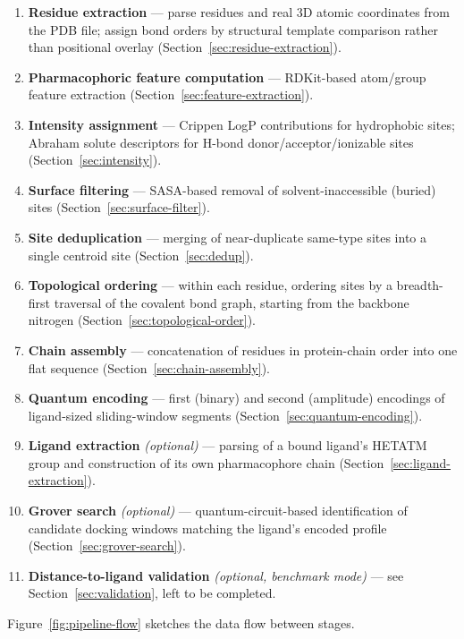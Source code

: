 \documentclass[11pt,a4paper]{article}
\begin{document}
\begin{enumerate}[leftmargin=1.8em]
    \item \textbf{Residue extraction} — parse residues and real 3D atomic coordinates from the PDB file; assign bond orders by structural template comparison rather than positional overlay (Section~\ref{sec:residue-extraction}).
    \item \textbf{Pharmacophoric feature computation} — RDKit-based atom/group feature extraction (Section~\ref{sec:feature-extraction}).
    \item \textbf{Intensity assignment} — Crippen LogP contributions for hydrophobic sites; Abraham solute descriptors for H-bond donor/acceptor/ionizable sites (Section~\ref{sec:intensity}).
    \item \textbf{Surface filtering} — SASA-based removal of solvent-inaccessible (buried) sites (Section~\ref{sec:surface-filter}).
    \item \textbf{Site deduplication} — merging of near-duplicate same-type sites into a single centroid site (Section~\ref{sec:dedup}).
    \item \textbf{Topological ordering} — within each residue, ordering sites by a breadth-first traversal of the covalent bond graph, starting from the backbone nitrogen (Section~\ref{sec:topological-order}).
    \item \textbf{Chain assembly} — concatenation of residues in protein-chain order into one flat sequence (Section~\ref{sec:chain-assembly}).
    \item \textbf{Quantum encoding} — first (binary) and second (amplitude) encodings of ligand-sized sliding-window segments (Section~\ref{sec:quantum-encoding}).
    \item \textbf{Ligand extraction} \emph{(optional)} — parsing of a bound ligand's HETATM group and construction of its own pharmacophore chain (Section~\ref{sec:ligand-extraction}).
    \item \textbf{Grover search} \emph{(optional)} — quantum-circuit-based identification of candidate docking windows matching the ligand's encoded profile (Section~\ref{sec:grover-search}).
    \item \textbf{Distance-to-ligand validation} \emph{(optional, benchmark mode)} — see Section~\ref{sec:validation}, left to be completed.
\end{enumerate}

Figure~\ref{fig:pipeline-flow} sketches the data flow between stages.
\end{document}
